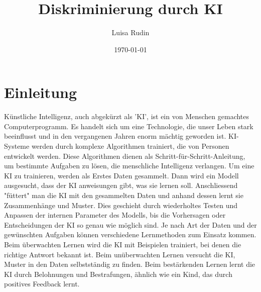 \documentclass{article}
\title{Diskriminierung durch KI}
\author{Luisa Rudin}
\date{\today}
\begin{document}
\maketitle


\tableofcontents

\section{Einleitung}
Künstliche Intelligenz, auch abgekürzt als 'KI', ist ein von Menschen gemachtes Computerprogramm. Es handelt sich um eine Technologie, die unser Leben stark beeinflusst und in den vergangenen Jahren enorm mächtig geworden ist. KI-Systeme werden durch komplexe Algorithmen trainiert, die von Personen entwickelt werden. Diese Algorithmen dienen als Schritt-für-Schritt-Anleitung, um bestimmte Aufgaben zu lösen, die menschliche Intelligenz verlangen.  Um eine KI zu trainieren, werden als Erstes Daten gesammelt. Dann wird ein Modell ausgesucht, dass der KI anweisungen gibt, was sie lernen soll. Anschliessend "füttert" man die KI mit den gesammelten Daten und anhand dessen lernt sie Zusammenhänge und Muster. Dies geschieht durch wiederholtes Testen und Anpassen der internen Parameter des Modells, bis die Vorhersagen oder Entscheidungen der KI so genau wie möglich sind. Je nach Art der Daten und der gewünschten Aufgaben können verschiedene Lernmethoden zum Einsatz kommen. Beim überwachten Lernen wird die KI mit Beispielen trainiert, bei denen die richtige Antwort bekannt ist. Beim unüberwachten Lernen versucht die KI, Muster in den Daten selbstständig zu finden. Beim bestärkenden Lernen lernt die KI durch Belohnungen und Bestrafungen, ähnlich wie ein Kind, das durch positives Feedback lernt.
\end{document}
